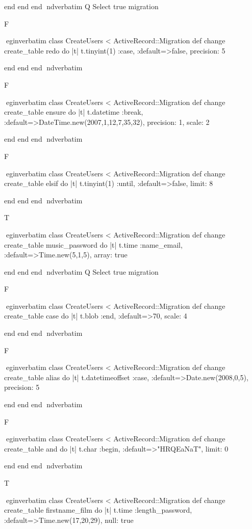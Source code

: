     end 
  end 
end
nd{verbatim}
Q
 Select true migration

F

egin{verbatim}
 class CreateUsers < ActiveRecord::Migration 
  def change 
    create_table redo do |t| 
      t.tinyint(1) :case, :default=>false, precision: 5
    
    end 
  end 
end
nd{verbatim}

F

egin{verbatim}
 class CreateUsers < ActiveRecord::Migration 
  def change 
    create_table ensure do |t| 
      t.datetime :break, :default=>DateTime.new(2007,1,12,7,35,32), precision: 1, scale: 2
    
    end 
  end 
end
nd{verbatim}

F

egin{verbatim}
 class CreateUsers < ActiveRecord::Migration 
  def change 
    create_table elsif do |t| 
      t.tinyint(1) :until, :default=>false, limit: 8
    
    end 
  end 
end
nd{verbatim}

T

egin{verbatim}
 class CreateUsers < ActiveRecord::Migration 
  def change 
    create_table music_password do |t| 
      t.time :name_email, :default=>Time.new(5,1,5), array: true
    
    end 
  end 
end
nd{verbatim}
Q
 Select true migration

F

egin{verbatim}
 class CreateUsers < ActiveRecord::Migration 
  def change 
    create_table case do |t| 
      t.blob :end, :default=>70, scale: 4
    
    end 
  end 
end
nd{verbatim}

F

egin{verbatim}
 class CreateUsers < ActiveRecord::Migration 
  def change 
    create_table alias do |t| 
      t.datetimeoffset :case, :default=>Date.new(2008,0,5), precision: 5
    
    end 
  end 
end
nd{verbatim}

F

egin{verbatim}
 class CreateUsers < ActiveRecord::Migration 
  def change 
    create_table and do |t| 
      t.char :begin, :default=>"HRQEaNaT", limit: 0
    
    end 
  end 
end
nd{verbatim}

T

egin{verbatim}
 class CreateUsers < ActiveRecord::Migration 
  def change 
    create_table firstname_film do |t| 
      t.time :length_password, :default=>Time.new(17,20,29), null: true
    
